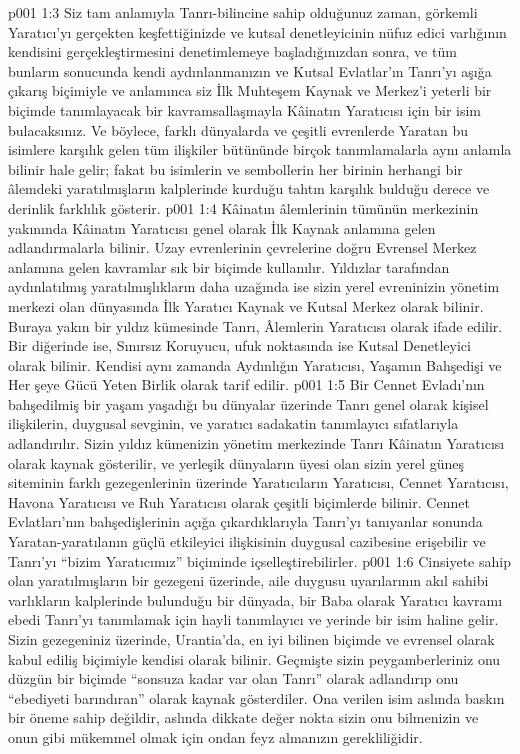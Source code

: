 \vs p001 1:3 Siz tam anlamıyla Tanrı\hyp{}bilincine sahip olduğunuz zaman, görkemli Yaratıcı’yı gerçekten keşfettiğinizde ve kutsal denetleyicinin nüfuz edici varlığının kendisini gerçekleştirmesini denetimlemeye başladığınızdan sonra, ve tüm bunların sonucunda kendi aydınlanmanızın ve Kutsal Evlatlar’ın Tanrı’yı aşığa çıkarış biçimiyle ve anlamınca siz İlk Muhteşem Kaynak ve Merkez’i yeterli bir biçimde tanımlayacak bir kavramsallaşmayla Kâinatın Yaratıcısı için bir isim bulacaksınız. Ve böylece, farklı dünyalarda ve çeşitli evrenlerde Yaratan bu isimlere karşılık gelen tüm ilişkiler bütününde birçok tanımlamalarla aynı anlamla bilinir hale gelir; fakat bu isimlerin ve sembollerin her birinin herhangi bir âlemdeki yaratılmışların kalplerinde kurduğu tahtın karşılık bulduğu derece ve derinlik farklılık gösterir.
\vs p001 1:4 Kâinatın âlemlerinin tümünün merkezinin yakınında Kâinatın Yaratıcısı genel olarak İlk Kaynak anlamına gelen adlandırmalarla bilinir. Uzay evrenlerinin çevrelerine doğru Evrensel Merkez anlamına gelen kavramlar sık bir biçimde kullanılır. Yıldızlar tarafından aydınlatılmış yaratılmışlıkların daha uzağında ise sizin yerel evreninizin yönetim merkezi olan dünyasında İlk Yaratıcı Kaynak ve Kutsal Merkez olarak bilinir. Buraya yakın bir yıldız kümesinde Tanrı, Âlemlerin Yaratıcısı olarak ifade edilir. Bir diğerinde ise, Sınırsız Koruyucu, ufuk noktasında ise Kutsal Denetleyici olarak bilinir. Kendisi aynı zamanda Aydınlığın Yaratıcısı, Yaşamın Bahşedişi ve Her şeye Gücü Yeten Birlik olarak tarif edilir.
\vs p001 1:5 Bir Cennet Evladı’nın bahşedilmiş bir yaşam yaşadığı bu dünyalar üzerinde Tanrı genel olarak kişisel ilişkilerin, duygusal sevginin, ve yaratıcı sadakatin tanımlayıcı sıfatlarıyla adlandırılır. Sizin yıldız kümenizin yönetim merkezinde Tanrı Kâinatın Yaratıcısı olarak kaynak gösterilir, ve yerleşik dünyaların üyesi olan sizin yerel güneş siteminin farklı gezegenlerinin üzerinde Yaratıcıların Yaratıcısı, Cennet Yaratıcısı, Havona Yaratıcısı ve Ruh Yaratıcısı olarak çeşitli biçimlerde bilinir. Cennet Evlatları’nın bahşedişlerinin açığa çıkardıklarıyla Tanrı’yı tanıyanlar sonunda Yaratan\hyp{}yaratılanın güçlü etkileyici ilişkisinin duygusal cazibesine erişebilir ve Tanrı’yı “bizim Yaratıcımız” biçiminde içselleştirebilirler.
\vs p001 1:6 Cinsiyete sahip olan yaratılmışların bir gezegeni üzerinde, aile duygusu uyarılarının akıl sahibi varlıkların kalplerinde bulunduğu bir dünyada, bir Baba olarak Yaratıcı kavramı ebedi Tanrı’yı tanımlamak için hayli tanımlayıcı ve yerinde bir isim haline gelir. Sizin gezegeniniz üzerinde, Urantia’da, en iyi bilinen biçimde ve evrensel olarak kabul ediliş biçimiyle kendisi  olarak bilinir. Geçmişte sizin peygamberleriniz onu düzgün bir biçimde “sonsuza kadar var olan Tanrı” olarak adlandırıp onu “ebediyeti barındıran” olarak kaynak gösterdiler. Ona verilen isim aslında baskın bir öneme sahip değildir, aslında dikkate değer nokta sizin onu bilmenizin ve onun gibi mükemmel olmak için ondan feyz almanızın gerekliliğidir.
